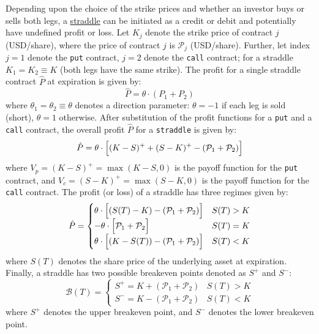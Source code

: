 \documentclass[11pt]{article}
\theoremstyle{definition}
\begin{document}
Depending upon the choice of the strike prices and whether an investor buys or sells both legs, 
a \href{https://www.investopedia.com/terms/s/straddle.asp}{straddle} can be initiated as a credit or debit and potentially have undefined profit or loss.
Let $K_{j}$ denote the strike price of contract $j$ (USD/share), where the price of contract $j$ is $\mathcal{P}_{j}$ (USD/share). 
Further, let index $j=1$ denote the \texttt{put} contract, $j=2$ denote the \texttt{call} contract; 
for a straddle $K_{1}= K_{2}\equiv{K}$ (both legs have the same strike). The profit for a single straddle contract $\hat{P}$ at expiration is given by:
\begin{equation}
\hat{P} = \theta\cdot\left(P_{1}+P_{2}\right)
\end{equation}
where $\theta_{1}=\theta_{2}\equiv\theta$ denotes a direction parameter: $\theta=-1$ if each leg is sold (short),
$\theta=1$ otherwise. After substitution of the profit functions for a \texttt{put} and a \texttt{call} contract, the overall profit $\hat{P}$ for a \texttt{straddle} 
is given by:
\begin{equation}
\hat{P} = \theta\cdot\Bigl[(K-S)^{+}+(S-K)^{+}-(\mathcal{P}_{1}+\mathcal{P}_{2})\Bigr]
\end{equation}
where $V_{p} = (K-S)^{+}=\max(K-S,0)$ is the payoff function for the \texttt{put} contract, and $V_{c} = (S-K)^{+} = \max(S-K,0)$ is the payoff function for the \texttt{call} contract. 
The profit (or loss) of a straddle has three regimes given by:
\begin{equation}
\hat{P} = \begin{cases}
  \theta\cdot\Bigl[(S(T)-K)-\left(\mathcal{P}_{1}+\mathcal{P}_{2}\right)\Bigr]  & S(T)>K \\
  -\theta\cdot\Bigl[\mathcal{P}_{1}+\mathcal{P}_{2}\Bigr] & S(T)=K \\
    \theta\cdot\Bigl[(K-S(T))-\left(\mathcal{P}_{1}+\mathcal{P}_{2}\right)\Bigr] & S(T)<K
\end{cases}
\end{equation}
where $S(T)$ denotes the share price of the underlying asset at expiration. Finally, a straddle has two possible breakeven points denoted as $S^{+}$ and $S^{-}$:
\begin{equation}
	\mathcal{B}(T) = \begin{cases}
		S^{+} = K + \left(\mathcal{P}_{1}+\mathcal{P}_{2}\right) & S(T)>K \\
		S^{-} = K - \left(\mathcal{P}_{1}+\mathcal{P}_{2}\right) & S(T)<K
	\end{cases}
\end{equation}
where $S^{+}$ denotes the upper breakeven point, and $S^{-}$ denotes the lower breakeven point.
\end{document}
